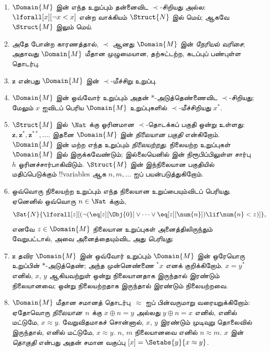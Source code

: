 \documentclass[../../../include/open-logic-section]{subfiles}
\begin{document}
\begin{enumerate}
\item $\Domain{M}$ இன் எந்த உறுப்பும் தன்னைவிட
  $\prec$-சிறியது அல்ல: $\lforall[x][\lnot x < x]$
  என்ற வாக்கியம் $\Struct{N}$ இல் மெய்; ஆகவே
  $\Struct{M}$ இலும் மெய்.
\item அதே போன்ற காரணத்தால், $\prec$ ஆனது
  $\Domain{M}$ இன் \emph{நேரியல் வரிசை}; அதாவது
  $\Domain{M}$ மீதான முழுமையான, தற்சுட்டற்ற,
  கடப்புப் பண்புள்ள தொடர்பு.
\item $\mathbf{z}$ என்பது $\Domain{M}$ இன்
  $\prec$-மீச்சிறு உறுப்பு.
\item $\Domain{M}$ இன் ஒவ்வோர் உறுப்பும் அதன்
  $*$-அடுத்தெண்ணைவிட $\prec$-சிறியது; மேலும்
  $x$ ஐவிடப் பெரிய $\Domain{M}$ உறுப்புகளில்
  $\prec$-மீச்சிறியது $x^*$.

\item $\Struct{M}$ இல்~$\Nat$ க்கு ஓரினமான
  $\prec$-தொடக்கப் பகுதி ஒன்று உள்ளது:
  $\mathbf{z}, \mathbf{z}^*, \mathbf{z}^{**}, \dots$.
  இதனை $\Domain{M}$ இன் \emph{நிலையான பகுதி}
  என்கிறோம். $\Domain{M}$ இன் மற்ற எந்த உறுப்பும்
  \emph{நிலையற்றது}. நிலையற்ற உறுப்புகள்
  $\Domain{M}$ இல் இருக்கவேண்டும்; இல்லையெனில்
   இன் நிரூபிப்பிலுள்ள சார்பு~$h$
  ஓரினச்சார்பாகிவிடும். $\Struct{M}$ இன் இந்நிலையான
  பகுதியில் மதிப்பெடுக்கும் !!{variable}s ஆக
  $n, m, \dots$ ஐப் பயன்படுத்துகிறோம்.
\item ஒவ்வொரு நிலையற்ற உறுப்பும் எந்த நிலையான
  உறுப்பையும்விடப் பெரியது. ஏனெனில்
  ஒவ்வொரு $n \in \Nat$ க்கும்,
  \[
  \Sat{N}{\lforall[z][(\lnot(\eq[z][\Obj{0}] \lor
  \dots \lor \eq[z][\num{n}]) \lif \num{n} < z)]},
  \]
  எனவே $z \in \Domain{M}$ நிலையான உறுப்புகள்
  அனைத்திலிருந்தும் வேறுபட்டால், அவை அனைத்தையும்விட
  அது \emph{பெரியது}.
\item $\mathbf{z}$ தவிர $\Domain{M}$ இன் ஒவ்வோர்
  உறுப்பும் $\Domain{M}$ இன் ஒரேயொரு உறுப்பின்
  $*$-அடுத்தெண்; அந்த முன்னெண்ணை $^*x$
  எனக் குறிக்கிறோம். $x = y^*$ எனில், $x$, $y$
  ஆகியவற்றுள் ஒன்று நிலையானதாக இருந்தால் இரண்டும்
  நிலையானவை; ஒன்று நிலையற்றதாக இருந்தால் இரண்டும்
  நிலையற்றவை.

\item $\Domain{M}$ மீதான சமானத் தொடர்பு~$\approx$
  ஐப் பின்வருமாறு வரையறுக்கிறோம்: ஏதோவொரு
  \emph{நிலையான}~$n$ க்கு
  $x \oplus n = y$ அல்லது $y \oplus n =x$
  எனில், எனில் மட்டுமே, $x \approx y$.
  வேறுவிதமாகச் சொன்னால், $x$, $y$ இரண்டும்
  முடிவுறு தொலைவில் இருந்தால், எனில் மட்டுமே,
  $x \approx y$. $n$, $m$ நிலையானவை எனில்
  $n \approx m$. $x$ இன் \emph{தொகுதி}
  என்பது அதன் சமான வகுப்பு
  $[x] = \Setabs{y}{x
  \approx y}$.


\end{enumerate}
\end{document}
